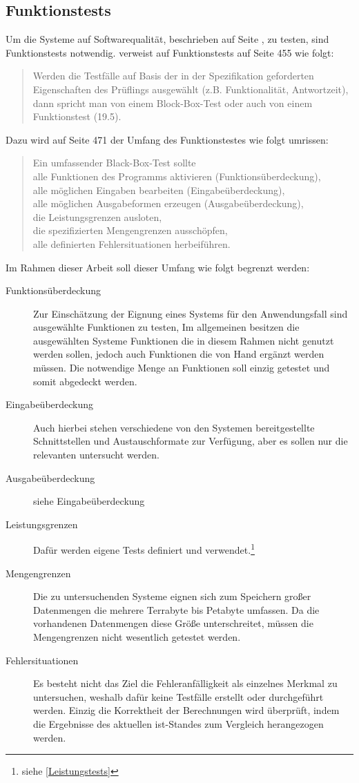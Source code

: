 \subsection{Funktionstests}
\label{grundlagen-funktionstests}
Um die Systeme auf Softwarequalität, beschrieben auf Seite \pageref{softwarequalität}, zu testen, sind Funktionstests notwendig.
\cite{book:softwareengineering} verweist auf Funktionstests auf Seite 455 wie folgt:
\begin{quote}
Werden die Testfälle auf Basis der in der Spezifikation geforderten Eigenschaften des Prüflings ausgewählt (z.B. Funktionalität, Antwortzeit), dann spricht man von einem Block-Box-Test oder auch von einem Funktionstest (19.5).
\end{quote}
Dazu wird auf Seite 471 der Umfang des Funktionstestes wie folgt umrissen:
\begin{quote}
Ein umfassender Black-Box-Test sollte\\
alle Funktionen des Programms aktivieren (Funktionsüberdeckung),\\
alle möglichen Eingaben bearbeiten (Eingabeüberdeckung),\\
alle möglichen Ausgabeformen erzeugen (Ausgabeüberdeckung),\\
die Leistungsgrenzen ausloten,\\
die spezifizierten Mengengrenzen ausschöpfen,\\
alle definierten Fehlersituationen herbeiführen.
\end{quote}
Im Rahmen dieser Arbeit soll dieser Umfang wie folgt begrenzt werden:
\begin{description}
\item[Funktionsüberdeckung] Zur Einschätzung der Eignung eines Systems für den Anwendungsfall sind ausgewählte Funktionen zu testen, Im allgemeinen besitzen die ausgewählten Systeme Funktionen die in diesem Rahmen nicht genutzt werden sollen, jedoch auch Funktionen die von Hand ergänzt werden müssen. Die notwendige Menge an Funktionen soll einzig getestet und somit abgedeckt werden.
\item[Eingabeüberdeckung] Auch hierbei stehen verschiedene von den Systemen bereitgestellte Schnittstellen und Austauschformate zur Verfügung, aber es sollen nur die relevanten untersucht werden.
\item[Ausgabeüberdeckung] siehe Eingabeüberdeckung
\item[Leistungsgrenzen] Dafür werden eigene Tests definiert und verwendet.\footnote{siehe \ref{Leistungstests}}
\item[Mengengrenzen] Die zu untersuchenden Systeme eignen sich zum Speichern großer Datenmengen die mehrere Terrabyte bis Petabyte umfassen. Da die vorhandenen Datenmengen diese Größe unterschreitet, müssen die Mengengrenzen nicht wesentlich getestet werden.
\item[Fehlersituationen] Es besteht nicht das Ziel die Fehleranfälligkeit als einzelnes Merkmal zu untersuchen, weshalb dafür keine Testfälle erstellt oder durchgeführt werden. Einzig die Korrektheit der Berechnungen wird überprüft, indem die Ergebnisse des aktuellen ist-Standes zum Vergleich herangezogen werden. 
\end{description}

